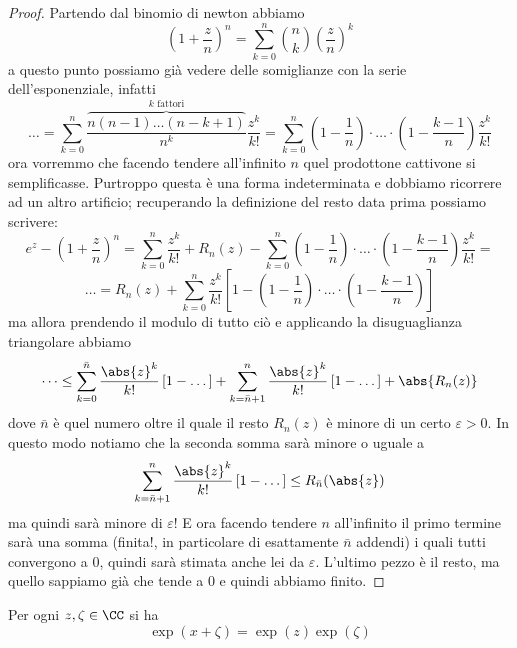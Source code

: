 \documentclass[11pt]{scrartcl}
\begin{document}
	 \begin{proof}
	 	Partendo dal binomio di newton abbiamo
	 	$$\left(1+\frac{z}{n}\right)^n=\sum_{k=0}^{n}\binom{n}{k}\left(\frac{z}{n}\right)^k$$
	 	a questo punto possiamo già vedere delle somiglianze con la serie dell'esponenziale, infatti
	 	$$\dots=\sum_{k=0}^n\frac{\overset{\text{$k$ fattori}}{\overbrace{n(n-1)\dots (n-k+1)}}}{n^k}\frac{z^k}{k!}=\sum_{k=0}^{n}\left(1-\frac{1}{n}\right)\cdot\dots\cdot\left(1-\frac{k-1}{n}\right)\frac{z^k}{k!}$$
	 	ora vorremmo che facendo tendere all'infinito $n$ quel prodottone cattivone si semplificasse. Purtroppo questa è una forma indeterminata e dobbiamo ricorrere ad un altro artificio; recuperando la definizione del resto data prima possiamo scrivere:
	 	$$e^z-\left(1+\frac{z}{n}\right)^n=\sum_{k=0}^{n}\frac{z^k}{k!}+R_n(z)-\sum_{k=0}^{n}\left(1-\frac{1}{n}\right)\cdot\dots\cdot\left(1-\frac{k-1}{n}\right)\frac{z^k}{k!}=$$
	 	$$\dots= R_n(z)+\sum_{k=0}^{n}\frac{z^k}{k!}\left[1-\left(1-\frac{1}{n}\right)\cdot\dots\cdot\left(1-\frac{k-1}{n}\right)\right]$$
	 	ma allora prendendo il modulo di tutto ciò e applicando la disuguaglianza triangolare abbiamo
	 	$$\dots \le \sum_{k=0}^{\bar{n}}\frac{\abs{z}^k}{k!}\left[1-\dots\right]+\sum_{k=\bar{n}+1}^{n}\frac{\abs{z}^k}{k!}\left[1-\dots\right]+\abs{R_n(z)}$$
	 	dove $\bar{n}$ è quel numero oltre il quale il resto $R_n(z)$ è minore di un certo $\varepsilon>0$. In questo modo notiamo che la seconda somma sarà minore o uguale a 
	 	$$\sum_{k=\bar{n}+1}^{n}\frac{\abs{z}^k}{k!}\left[1-\dots\right]\le R_{\bar{n}}(\abs{z})$$
	 	ma quindi sarà minore di $\varepsilon$! E ora facendo tendere $n$ all'infinito il primo termine sarà una somma (finita!, in particolare di esattamente $\bar{n}$ addendi) i quali tutti convergono a $0$, quindi sarà stimata anche lei da $\varepsilon$. L'ultimo pezzo è il resto, ma quello sappiamo già che tende a $0$ e quindi abbiamo finito. 
	 \end{proof}
	 \begin{theorem}
	 	Per ogni $z,\zeta\in\CC$ si ha
	 	$$\exp(x+\zeta)=\exp(z)\exp(\zeta)$$
	 \end{theorem}
\end{document}
